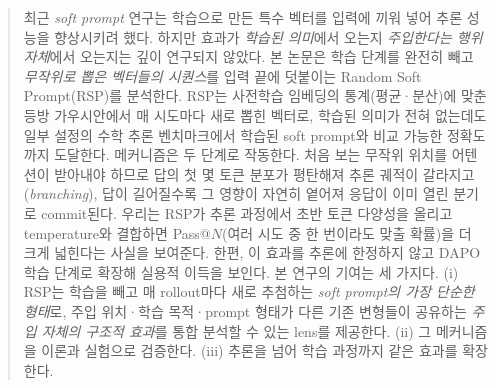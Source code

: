\begin{abstract}
최근 \textit{soft prompt} 연구는 학습으로 만든 특수 벡터를 입력에 끼워 넣어 추론 성능을 향상시키려 했다. 하지만 효과가 \emph{학습된 의미}에서 오는지 \emph{주입한다는 행위 자체}에서 오는지는 깊이 연구되지 않았다. 본 논문은 학습 단계를 완전히 빼고 \emph{무작위로 뽑은 벡터들의 시퀀스}를 입력 끝에 덧붙이는 Random Soft Prompt(RSP)를 분석한다. RSP는 사전학습 임베딩의 통계(평균·분산)에 맞춘 등방 가우시안에서 매 시도마다 새로 뽑힌 벡터로, 학습된 의미가 전혀 없는데도 일부 설정의 수학 추론 벤치마크에서 학습된 soft prompt와 비교 가능한 정확도까지 도달한다. 메커니즘은 두 단계로 작동한다. 처음 보는 무작위 위치를 어텐션이 받아내야 하므로 답의 첫 몇 토큰 분포가 평탄해져 추론 궤적이 갈라지고(\emph{branching}), 답이 길어질수록 그 영향이 자연히 옅어져 응답이 이미 열린 분기로 commit된다. 우리는 RSP가 추론 과정에서 초반 토큰 다양성을 올리고 temperature와 결합하면 Pass@$N$(여러 시도 중 한 번이라도 맞출 확률)을 더 크게 넓힌다는 사실을 보여준다. 한편, 이 효과를 추론에 한정하지 않고 DAPO \citep{yu2025dapo} 학습 단계로 확장해 실용적 이득을 보인다. 본 연구의 기여는 세 가지다. (i) RSP는 학습을 빼고 매 rollout마다 새로 추첨하는 \emph{soft prompt의 가장 단순한 형태}로, 주입 위치·학습 목적·prompt 형태가 다른 기존 변형들이 공유하는 \emph{주입 자체의 구조적 효과}를 통합 분석할 수 있는 lens를 제공한다. (ii) 그 메커니즘을 이론과 실험으로 검증한다. (iii) 추론을 넘어 학습 과정까지 같은 효과를 확장한다.
\end{abstract}


